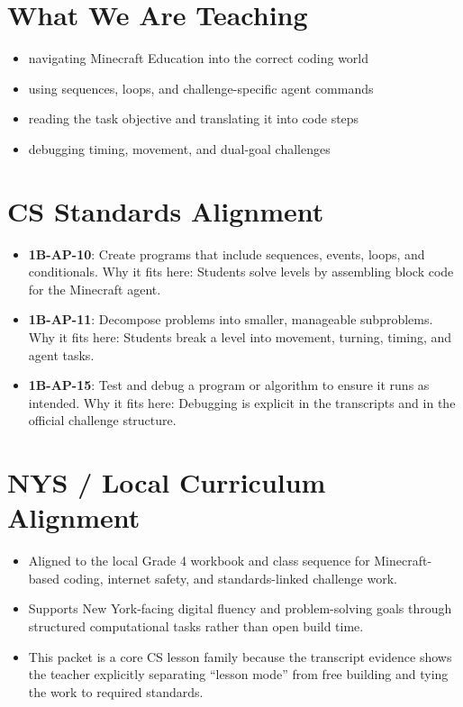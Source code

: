 \documentclass[11pt]{article}
\begin{document}
\section*{What We Are Teaching}
\begin{itemize}[leftmargin=*]
\item navigating Minecraft Education into the correct coding world
\item using sequences, loops, and challenge-specific agent commands
\item reading the task objective and translating it into code steps
\item debugging timing, movement, and dual-goal challenges
\end{itemize}

\section*{CS Standards Alignment}
\begin{itemize}[leftmargin=*]
\item \textbf{1B-AP-10}: Create programs that include sequences, events, loops, and conditionals. Why it fits here: Students solve levels by assembling block code for the Minecraft agent.
\item \textbf{1B-AP-11}: Decompose problems into smaller, manageable subproblems. Why it fits here: Students break a level into movement, turning, timing, and agent tasks.
\item \textbf{1B-AP-15}: Test and debug a program or algorithm to ensure it runs as intended. Why it fits here: Debugging is explicit in the transcripts and in the official challenge structure.
\end{itemize}

\section*{NYS / Local Curriculum Alignment}
\begin{itemize}[leftmargin=*]
\item Aligned to the local Grade 4 workbook and class sequence for Minecraft-based coding, internet safety, and standards-linked challenge work.
\item Supports New York-facing digital fluency and problem-solving goals through structured computational tasks rather than open build time.
\item This packet is a core CS lesson family because the transcript evidence shows the teacher explicitly separating “lesson mode” from free building and tying the work to required standards.
\end{itemize}
\end{document}
